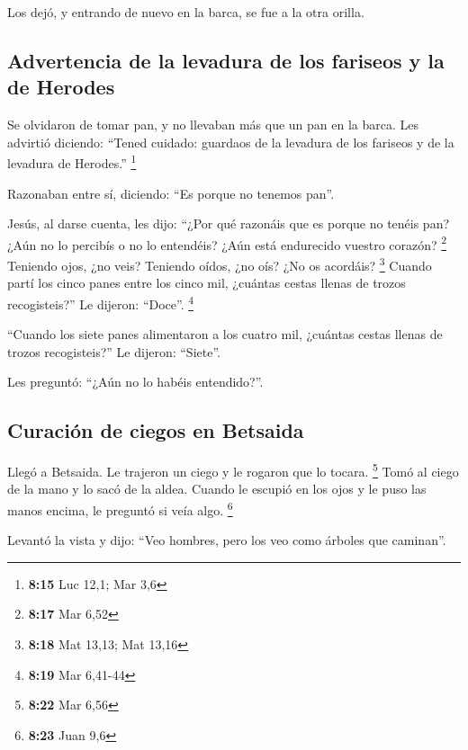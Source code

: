  Los dejó, y entrando de nuevo en la barca, se fue a la
otra orilla.

\hypertarget{advertencia-de-la-levadura-de-los-fariseos-y-la-de-herodes}{%
\subsection{Advertencia de la levadura de los fariseos y la de
Herodes}\label{advertencia-de-la-levadura-de-los-fariseos-y-la-de-herodes}}

 Se olvidaron de tomar pan, y no llevaban más que un pan
en la barca.  Les advirtió diciendo: ``Tened cuidado:
guardaos de la levadura de los fariseos y de la levadura de Herodes.''
\footnote{\textbf{8:15} Luc 12,1; Mar 3,6}

 Razonaban entre sí, diciendo: ``Es porque no tenemos
pan''.

 Jesús, al darse cuenta, les dijo: ``¿Por qué razonáis
que es porque no tenéis pan? ¿Aún no lo percibís o no lo entendéis? ¿Aún
está endurecido vuestro corazón? \footnote{\textbf{8:17} Mar 6,52}
 Teniendo ojos, ¿no veis? Teniendo oídos, ¿no oís? ¿No os
acordáis? \footnote{\textbf{8:18} Mat 13,13; Mat 13,16} 
Cuando partí los cinco panes entre los cinco mil, ¿cuántas cestas llenas
de trozos recogisteis?'' Le dijeron: ``Doce''. \footnote{\textbf{8:19}
  Mar 6,41-44}

 ``Cuando los siete panes alimentaron a los cuatro mil,
¿cuántas cestas llenas de trozos recogisteis?'' Le dijeron: ``Siete''.

 Les preguntó: ``¿Aún no lo habéis entendido?''.

\hypertarget{curaciuxf3n-de-ciegos-en-betsaida}{%
\subsection{Curación de ciegos en
Betsaida}\label{curaciuxf3n-de-ciegos-en-betsaida}}

 Llegó a Betsaida. Le trajeron un ciego y le rogaron que
lo tocara. \footnote{\textbf{8:22} Mar 6,56}  Tomó al
ciego de la mano y lo sacó de la aldea. Cuando le escupió en los ojos y
le puso las manos encima, le preguntó si veía algo. \footnote{\textbf{8:23}
  Juan 9,6}

 Levantó la vista y dijo: ``Veo hombres, pero los veo
como árboles que caminan''.

